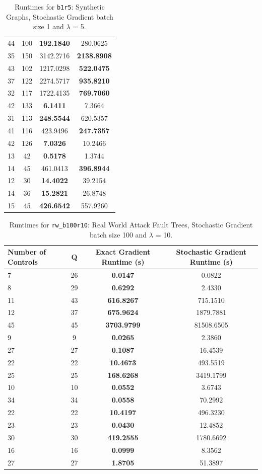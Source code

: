 \documentclass{article}
\begin{document}
\begin{table}[h]
\begin{tabular}{lccc}
44 & 100 & \textbf{192.1840} & 280.0625 \\
35 & 150 & 3142.2716 & \textbf{2138.8908} \\
43 & 102 & 1217.0298 & \textbf{522.0475} \\
37 & 122 & 2274.5717 & \textbf{935.8210} \\
32 & 117 & 1722.4135 & \textbf{769.7060} \\
42 & 133 & \textbf{6.1411} & 7.3664 \\
31 & 113 & \textbf{248.5544} & 620.5357 \\
41 & 116 & 423.9496 & \textbf{247.7357} \\
42 & 126 & \textbf{7.0326} & 10.2466 \\
13 & 42 & \textbf{0.5178} & 1.3744 \\
14 & 45 & 461.0413 & \textbf{396.8944} \\
12 & 30 & \textbf{14.4022} & 39.2154 \\
14 & 36 & \textbf{15.2821} & 26.8748 \\
15 & 45 & \textbf{426.6542} & 557.9260 \\
\bottomrule
\end{tabular}
\caption{Runtimes for \texttt{b1r5}: Synthetic Graphs, Stochastic Gradient batch size 1 and $\lambda$ = 5.}
\end{table}

\begin{table}[h]
\centering
\begin{tabular}{lccc}
\toprule
Number of Controls & Q & Exact Gradient Runtime (s) & Stochastic Gradient Runtime (s) \\
\midrule
7 & 26 & \textbf{0.0147} & 0.0822 \\
8 & 29 & \textbf{0.6292} & 2.4330 \\
11 & 43 & \textbf{616.8267} & 715.1510 \\
12 & 37 & \textbf{675.9624} & 1879.7881 \\
45 & 45 & \textbf{3703.9799} & 81508.6505 \\
9 & 9 & \textbf{0.0265} & 2.3860 \\
27 & 27 & \textbf{0.1087} & 16.4539 \\
22 & 22 & \textbf{10.4673} & 493.5519 \\
25 & 25 & \textbf{168.6268} & 3419.1799 \\
10 & 10 & \textbf{0.0552} & 3.6743 \\
34 & 34 & \textbf{0.0558} & 70.2992 \\
22 & 22 & \textbf{10.4197} & 496.3230 \\
23 & 23 & \textbf{0.0430} & 12.4852 \\
30 & 30 & \textbf{419.2555} & 1780.6692 \\
16 & 16 & \textbf{0.0999} & 8.3562 \\
27 & 27 & \textbf{1.8705} & 51.3897 \\
\bottomrule
\end{tabular}
\caption{Runtimes for \texttt{rw\_b100r10}: Real World Attack Fault Trees, Stochastic Gradient batch size 100 and $\lambda$ = 10.}
\end{table}
\end{document}

